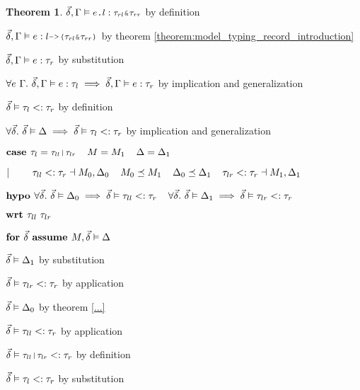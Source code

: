 \documentclass[acmsmall]{acmart}
\theoremstyle{definition}
\newtheorem{theorem}{Theorem}[section]
\begin{document}
\begin{theorem}
          \item \Z\Z\Z\Z $\vec{\delta}, \Gamma \satisfies \J{$e$.$l$} \hastype \J{$\tau_{rl}$\&$\tau_{rr}$}$ by definition
          \item \Z\Z\Z\Z $\vec{\delta}, \Gamma \satisfies e \hastype \J{$l$->($\tau_{rl}$\&$\tau_{rr}$)}$ by theorem \ref{theorem:model_typing_record_introduction} 
          \item \Z\Z\Z\Z $\vec{\delta}, \Gamma \vDash e : \tau_r$ by substitution 
        \item \Z\Z\Z $\forall e\ \Gamma .\ \vec{\delta}, \Gamma \vDash e : \tau_l \implies 
          \vec{\delta}, \Gamma \vDash e : \tau_r
        $ by implication and generalization
        \item \Z\Z\Z $\vec{\delta} \vDash \tau_l <: \tau_r$
        by definition 
      \item \Z\Z $\forall \vec{\delta} .\ \vec{\delta} \vDash \Delta \implies \vec{\delta} \vDash \tau_l <: \tau_r$ 
      by implication and generalization 


    \item \Z $\B{case } 
      \tau_l = \J{$\tau_{ll}$|$\tau_{lr}$}
      \I
      M = M_1
      \I
      \Delta = \Delta_1
    $
    \item \Z $|\ \ \ \ \ \ \ 
      \tau_{ll} <: \tau_r
      \dashv M_0, \Delta_0
      \hspace{4mm}
      M_0 \preceq M_1
      \hspace{4mm}
      \Delta_0 \preceq \Delta_1
      \hspace{4mm}
      \tau_{lr} <: \tau_r
      \dashv M_1, \Delta_1
    $

    \item \Z $\textbf{hypo } 
      \forall \vec{\delta} .\ \vec{\delta} \vDash \Delta_0 \implies \vec{\delta} \vDash \tau_{ll} <: \tau_r
      \hspace{4mm}
      \forall \vec{\delta} .\ \vec{\delta} \vDash \Delta_1 \implies \vec{\delta} \vDash \tau_{lr} <: \tau_r
    $
    \item \Z $\textbf{wrt } \tau_{ll}\ \tau_{lr}$

      \item \Z\Z $\textbf{for } \vec{\delta} \textbf{ assume } M, \vec{\delta} \vDash \Delta$
        \item \Z\Z\Z $\vec{\delta} \vDash \Delta_1$ by substitution 
        \item \Z\Z\Z $\vec{\delta} \vDash \tau_{lr} <: \tau_r$ by application 
        \item \Z\Z\Z $\vec{\delta} \vDash \Delta_0$ by theorem \ref{...}  
        \item \Z\Z\Z $\vec{\delta} \vDash \tau_{ll} <: \tau_r$ by application 
        \item \Z\Z\Z $\vec{\delta} \satisfies \J{$\tau_{ll}$|$\tau_{lr}$} \subtypes \tau_r$ 
        by definition
        \item \Z\Z\Z $\vec{\delta} \vDash \tau_l <: \tau_r$ 
        by substitution 


\end{theorem}
\end{document}
